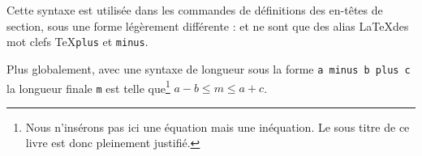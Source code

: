 \begin{latexcode}
\vspace{2.5cm minus 1.5cm plus 0.5cm}
\end{latexcode}

Cette syntaxe est utilisée dans les commandes de définitions des en-têtes de section, sous une forme légèrement différente :  et  ne sont que des alias \LaTeX des mot clefs \TeX \verb|plus| et \verb|minus|.

Plus globalement, avec une syntaxe de longueur sous la forme \verb|a minus b plus c| la longueur finale \verb|m| est telle que\footnote{Nous n'insérons pas ici une équation mais une inéquation. Le sous titre de ce livre est donc pleinement justifié.} $ a - b \leq m \leq a + c $.  

